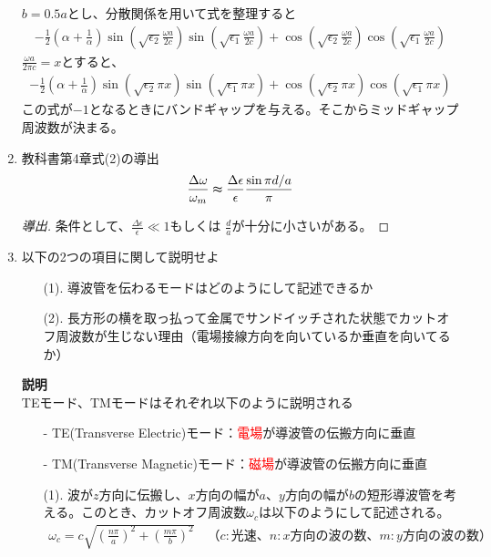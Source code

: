 \documentclass[a4paper,11pt,dvipdfmx]{jsarticle}
\begin{document}
\begin{enumerate}
    $b = 0.5a$とし、分散関係を用いて式を整理すると
    \begin{align*}
      - \frac{1}{2} \left( \alpha + \frac{1}{\alpha} \right) \sin \left( \sqrt{\epsilon_2} \frac{\omega a}{2 c} \right)\sin \left( \sqrt{\epsilon_1} \frac{\omega a}{2 c} \right) + \cos \left( \sqrt{\epsilon_2} \frac{\omega a}{2 c} \right)\cos \left( \sqrt{\epsilon_1} \frac{\omega a}{2 c} \right)
    \end{align*}
    $\displaystyle \frac{\omega a}{2 \pi c} = x$とすると、
    \begin{align*}
      - \frac{1}{2} \left( \alpha + \frac{1}{\alpha} \right) \sin \left( \sqrt{\epsilon_2} \pi x \right)\sin \left( \sqrt{\epsilon_1} \pi x \right) + \cos \left( \sqrt{\epsilon_2} \pi x \right)\cos \left( \sqrt{\epsilon_1} \pi x \right)
    \end{align*}
    この式が$-1$となるときにバンドギャップを与える。そこからミッドギャップ周波数が決まる。
    \item 教科書第4章式(2)の導出
    \begin{align*}
      \frac{\Delta \omega}{\omega_m} \thickapprox \frac{\Delta \epsilon}{\epsilon} \frac{\sin \pi d / a}{\pi}
    \end{align*}
    \begin{proof}[導出]
      条件として、$\displaystyle \frac{\Delta \epsilon}{\epsilon} \ll 1$もしくは $\displaystyle \frac{d}{a}$が十分に小さいがある。 
    \end{proof}
    \item 以下の2つの項目に関して説明せよ
    \begin{itemize}
      \item[(1).] 導波管を伝わるモードはどのようにして記述できるか
      \item[(2).] 長方形の横を取っ払って金属でサンドイッチされた状態でカットオフ周波数が生じない理由（電場接線方向を向いているか垂直を向いてるか）
    \end{itemize}
    \textbf{説明}
    \\
    TEモード、TMモードはそれぞれ以下のように説明される
      \begin{itemize}
        \item[-] TE(Transverse Electric)モード：\textcolor{red}{電場}が導波管の伝搬方向に垂直
        \item[-] TM(Transverse Magnetic)モード：\textcolor{red}{磁場}が導波管の伝搬方向に垂直
      \end{itemize}
    \begin{itemize}
      \item[(1).] 波が$z$方向に伝搬し、$x$方向の幅が$a$、$y$方向の幅が$b$の短形導波管を考える。このとき、カットオフ周波数$\omega_c$は以下のようにして記述される。
      \begin{align*}
        \omega_c = c \sqrt{\left( \frac{n \pi}{a} \right)^2 + \left( \frac{m \pi}{b} \right)^2} \quad （c:光速、 n: x方向の波の数、m:y方向の波の数）
      \end{align*}
      

\end{itemize}
\end{enumerate}
\end{document}
